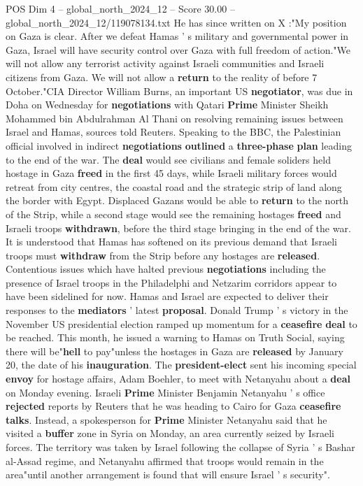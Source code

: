 \begin{textsample}{POS Dim 4 – global\_north\_2024\_12 – Score 30.00 – global\_north\_2024\_12/119078134.txt}
He has since written on X :"My position on Gaza is clear.
After we defeat Hamas ' s military and governmental power in Gaza, Israel will have security control over Gaza with full freedom of action."We will not allow any terrorist activity against Israeli communities and Israeli citizens from Gaza.
We will not allow a \textbf{return} to the reality of before 7 October."CIA Director William Burns, an important US \textbf{negotiator}, was due in Doha on Wednesday for \textbf{negotiations} with Qatari \textbf{Prime} Minister Sheikh Mohammed bin Abdulrahman Al Thani on resolving remaining issues between Israel and Hamas, sources told Reuters.
Speaking to the BBC, the Palestinian official involved in indirect \textbf{negotiations} \textbf{outlined} a \textbf{three-phase} \textbf{plan} leading to the end of the war.
The \textbf{deal} would see civilians and female soliders held hostage in Gaza \textbf{freed} in the first 45 days, while Israeli military forces would retreat from city centres, the coastal road and the strategic strip of land along the border with Egypt.
Displaced Gazans would be able to \textbf{return} to the north of the Strip, while a second stage would see the remaining hostages \textbf{freed} and Israeli troops \textbf{withdrawn}, before the third stage bringing in the end of the war.
It is understood that Hamas has softened on its previous demand that Israeli troops must \textbf{withdraw} from the Strip before any hostages are \textbf{released}.
Contentious issues which have halted previous \textbf{negotiations} including the presence of Israel troops in the Philadelphi and Netzarim corridors appear to have been sidelined for now.
Hamas and Israel are expected to deliver their responses to the \textbf{mediators} ' latest \textbf{proposal}.
Donald Trump ' s victory in the November US presidential election ramped up momentum for a \textbf{ceasefire} \textbf{deal} to be reached.
This month, he issued a warning to Hamas on Truth Social, saying there will be"\textbf{hell} to pay"unless the hostages in Gaza are \textbf{released} by January 20, the date of his \textbf{inauguration}.
The \textbf{president-elect} sent his incoming special \textbf{envoy} for hostage affairs, Adam Boehler, to meet with Netanyahu about a \textbf{deal} on Monday evening.
Israeli \textbf{Prime} Minister Benjamin Netanyahu ' s office \textbf{rejected} reports by Reuters that he was heading to Cairo for Gaza \textbf{ceasefire} \textbf{talks}.
Instead, a spokesperson for \textbf{Prime} Minister Netanyahu said that he visited a \textbf{buffer} zone in Syria on Monday, an area currently seized by Israeli forces.
The territory was taken by Israel following the collapse of Syria ' s Bashar al-Assad regime, and Netanyahu affirmed that troops would remain in the area"until another arrangement is found that will ensure Israel ' s security".

\end{textsample}
